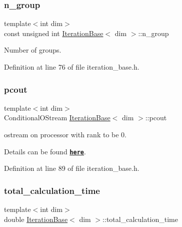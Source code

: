 \subsubsection{\texorpdfstring{n\+\_\+group}{n\_group}}
{\footnotesize\ttfamily template$<$int dim$>$ \\
const unsigned int \hyperlink{class_iteration_base}{Iteration\+Base}$<$ dim $>$\+::n\+\_\+group\hspace{0.3cm}{\ttfamily [protected]}}



Number of groups. 



Definition at line 76 of file iteration\+\_\+base.\+h.

\mbox{\label{class_iteration_base_ab057491553962560cfad06f19fb00ff5}} 
\subsubsection{\texorpdfstring{pcout}{pcout}}
{\footnotesize\ttfamily template$<$int dim$>$ \\
Conditional\+O\+Stream \hyperlink{class_iteration_base}{Iteration\+Base}$<$ dim $>$\+::pcout\hspace{0.3cm}{\ttfamily [protected]}}



ostream on processor with rank to be 0. 

Details can be found \href{https://www.dealii.org/8.5.0/doxygen/deal.II/cl
assConditionalOStream.html}{\tt {\bfseries here}}. 

Definition at line 89 of file iteration\+\_\+base.\+h.

\mbox{\label{class_iteration_base_a98cf351c6b85b6bbdc68c914ecdaaf1e}} 
\subsubsection{\texorpdfstring{total\+\_\+calculation\+\_\+time}{total\_calculation\_time}}
{\footnotesize\ttfamily template$<$int dim$>$ \\
double \hyperlink{class_iteration_base}{Iteration\+Base}$<$ dim $>$\+::total\+\_\+calculation\+\_\+time\hspace{0.3cm}{\ttfamily [protected]}}

